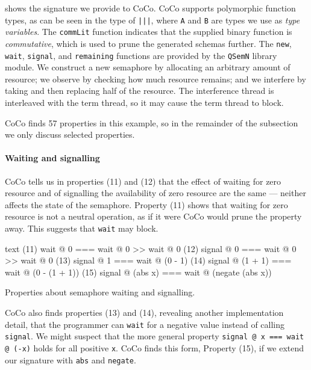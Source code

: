  shows the signature we provide to CoCo.  CoCo supports
polymorphic function types, as can be seen in the type of \verb#|||#,
where \verb|A| and \verb|B| are types we use as \emph{type variables}.
The \verb|commLit| function indicates that the supplied binary
function is \emph{commutative}, which is used to prune the generated
schemas further.  The \verb|new|, \verb|wait|, \verb|signal|, and
\verb|remaining| functions are provided by the \verb|QSemN| library
module.  We construct a new semaphore by allocating an arbitrary
amount of resource; we observe by checking how much resource remains;
and we interfere by taking and then replacing half of the resource.
The interference thread is interleaved with the term thread, so it may
cause the term thread to block.

CoCo finds 57 properties in this example, so in the remainder of the
subsection we only discuss selected properties.

\paragraph{Waiting and signalling}
CoCo tells us in properties (11) and (12) that the effect of waiting
for zero resource and of signalling the availability of zero resource
are the same --- neither affects the state of the semaphore.  Property
(11) shows that waiting for zero resource is not a neutral operation,
as if it were CoCo would prune the property away.  This suggests that
\verb|wait| may block.

\begin{listing}
\centering
\begin{cminted}{text}
(11)          wait @ 0  ===  wait @ 0 >> wait @ 0
(12)        signal @ 0  ===  wait @ 0 >> wait @ 0
(13)        signal @ 1  ===  wait @ (0 - 1)
(14)  signal @ (1 + 1)  ===  wait @ (0 - (1 + 1))
(15)  signal @ (abs x)  ===  wait @ (negate (abs x))
\end{cminted}
\caption{Properties about semaphore waiting and signalling.}\label{lst:sem2}
\end{listing}

CoCo also finds properties (13) and (14), revealing another
implementation detail, that the programmer can \verb|wait| for a
negative value instead of calling \verb|signal|.  We might suspect
that the more general property \verb|signal @ x === wait @ (-x)| holds
for all positive \verb|x|.  CoCo finds this form, Property (15), if we
extend our signature with \verb|abs| and \verb|negate|.

